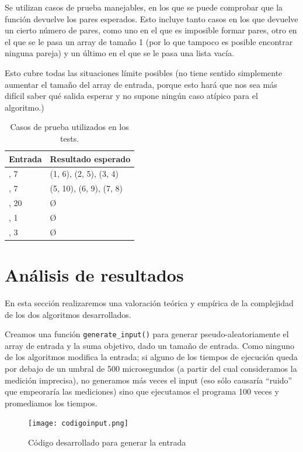 \documentclass[a4paper, titlepage]{article}
\begin{document}
Se utilizan casos de prueba manejables, en los que se puede comprobar que la función devuelve los pares esperados. Esto incluye tanto casos en los que devuelve un cierto número de pares, como uno en el que es imposible formar pares, otro en el que se le pasa un array de tamaño 1 (por lo que tampoco es posible encontrar ninguna pareja) y un último en el que se le pasa una lista vacía.

Esto cubre todas las situaciones límite posibles (no tiene sentido simplemente aumentar el tamaño del array de entrada, porque esto hará que nos sea más difícil saber qué salida esperar y no supone ningún caso atípico para el algoritmo.)


\begin{table}[H]
\centering
\begin{tabular}{|l|l|}
\hline
\textbf{Entrada} & \textbf{Resultado esperado}\\  \hline \hline
[1, 2, 3, 4, 5, 6], 7 &  (1, 6), (2, 5), (3, 4)\\  \hline
[1, 2, 3, \dots, 10], 7 &  (5, 10), (6, 9), (7, 8)\\   \hline
[1, 3, 5], 20 & \O \\   \hline
[1], 1 & \O \\   \hline
[], 3 & \O \\   \hline
\end{tabular}
\caption{Casos de prueba utilizados en los tests.}
\label{pruebas}
\end{table}

\section{Análisis de resultados}

En esta sección realizaremos una valoración teórica y empírica de la complejidad de los dos algoritmos desarrollados.

Creamos una función \texttt{generate\_input()} para generar pseudo-aleatoriamente el array de entrada y la suma objetivo, dado un tamaño de entrada. Como ninguno de los algoritmos modifica la entrada; si alguno de los tiempos de ejecución queda por debajo de un umbral de 500 microsegundos (a partir del cual consideramos la medición imprecisa), no generamos más veces el input (eso sólo causaría ``ruido'' que empeoraría las mediciones) sino que ejecutamos el programa 100 veces y promediamos los tiempos.

\begin{figure}[h]

\texttt{[image: codigoinput.png]}
\caption{Código desarrollado para generar la entrada}

\end{figure}
\end{document}
